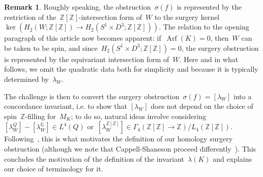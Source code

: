 \documentclass[10.9pt,a4paper]{amsart}
\theoremstyle{definition}
\newtheorem{remark}[theorem]{Remark}
\theoremstyle{remark}
\newcommand{\Z}{\mathbb{Z}}
\newcommand{\Q}{\mathbb{Q}}
\begin{document}
\begin{remark}
Roughly speaking, the obstruction~$\sigma(f)$ is represented by the restriction of the~$\Z[\Z]$-intersection form of~$W$ to the surgery kernel~$\ker(H_2(W;\Z[\Z])\to H_2(S^1 \times D^3;\Z[\Z]))$.
The relation to the opening paragraph of this article now becomes apparent: if~$\operatorname{Arf}(K)=0$, then~$W$ can be taken to be spin, and
since~$H_2(S^1 \times D^3;\Z[\Z])=0$, the surgery obstruction is represented by the equivariant intersection form of~$W$.
Here and in what follows, we omit the quadratic data both for simplicity and because it is typically determined by~$\lambda_W$.
\end{remark}

The challenge is then to convert the surgery obstruction~$\sigma(f)=[\lambda_W]$ into a concordance invariant, i.e.  to show that $[\lambda_W]$ does not depend on the choice of spin~$\Z$-filling for~$M_K$; to do so, natural ideas involve considering~$[\lambda_W^Q]-[\lambda_W^\Q] \in L^4(Q)$ or~$[\lambda_W^{\Z[\Z]}] \in \Gamma_4(\Z[\Z] \to \Z)/L_4(\Z[\Z])$. 
Following~\cite{LitherlandCobordism,
CochranOrrTeichner,ChaHirzebruch}, this is what motivates the definition of our homology surgery obstruction (although we note that Cappell-Shaneson proceed differently~\cite[Proposition 3.2]{CappellShaneson}).
This concludes the motivation of the definition of the invariant~$\lambda(K)$ and explains our choice of terminology for it.
\end{document}
